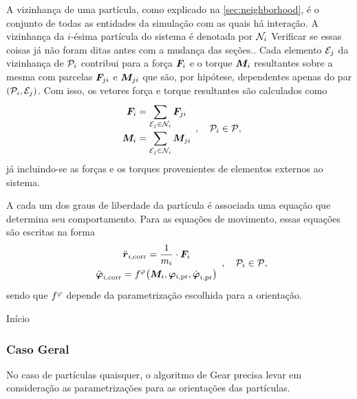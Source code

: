 A vizinhança de uma partícula, como explicado na \autoref{sec:neighborhood}, é o conjunto de todas as entidades da simulação com as quais há interação. A vizinhança da \(i\)-ésima partícula do sistema é denotada por \({\mathcal{N}}_{i}\) \alert{Verificar se essas coisas já não foram ditas antes com a mudança das seções.}. Cada elemento \({\mathcal{E}}_{j}\) da vizinhança de \(\particlei\) contribui para a força \({\bm{F}}_{i}\) e o torque \({\bm{M}}_{i}\) resultantes sobre a mesma com parcelas \({\bm{F}}_{j i}\) e \({\bm{M}}_{j i}\) que são, por hipótese, dependentes apenas do par \(\orderedPair{\particlei}{\elementj}\). Com isso, os vetores força e torque resultantes são calculados como
\begin{equation*}
	\def\arraystretch{1.5}
	\begin{array}{c}
		\displaystyle \forcei = \sum_{\elementj\in\neighborhoodi} \forceji \\
		\displaystyle \torquei = \sum_{\elementj\in\neighborhoodi} \torqueji 
	\end{array}, \quad \particlei \in \particleSet,
\end{equation*}
já incluindo-se as forças e os torques provenientes de elementos externos ao sistema.

A cada um dos graus de liberdade da partícula é associada uma equação que determina seu comportamento. Para as equações de movimento, essas equações são escritas na forma
\begin{equation*}
	\def\arraystretch{1.5}
	\begin{array}{c}
		\displaystyle \accelerationicorr =  \dfrac{1}{\massi}\cdot \forcei \\
		\displaystyle \dorientationicorr{2} = \eqFor{\orientationScalar}\pqty{\torquei, \orientationipr, \dorientationipr{1}}
	\end{array}, \quad \particlei \in \particleSet,
\end{equation*}
sendo que \(f^{\varphi}\) depende da parametrização escolhida para a orientação.

\alert{Início}

\subsubsection*{Caso Geral}

No caso de partículas quaisquer, o algoritmo de Gear precisa levar em consideração as parametrizações para as orientações das partículas.

